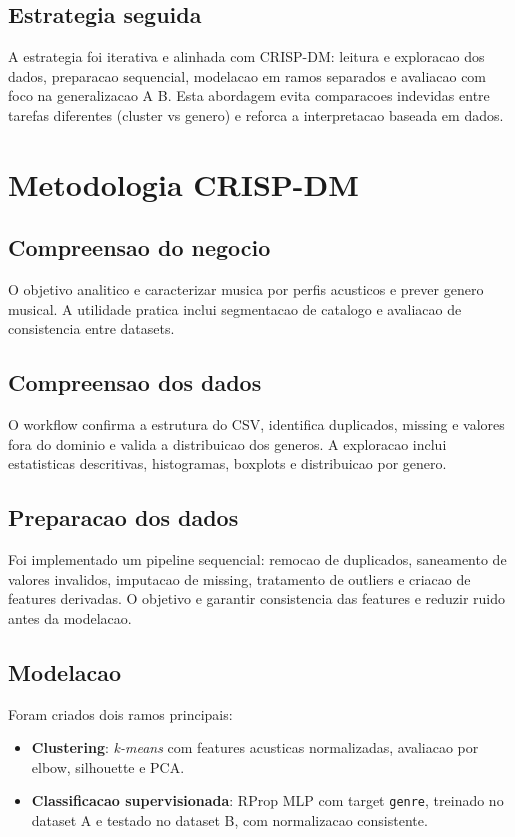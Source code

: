 \documentclass[11pt,a4paper]{article}
\begin{document}
\subsection{Estrategia seguida}
A estrategia foi iterativa e alinhada com CRISP-DM: leitura e exploracao dos dados, preparacao sequencial, modelacao em ramos separados e avaliacao com foco na generalizacao A \textrightarrow B. Esta abordagem evita comparacoes indevidas entre tarefas diferentes (cluster vs genero) e reforca a interpretacao baseada em dados.

\section{Metodologia CRISP-DM}
\subsection{Compreensao do negocio}
O objetivo analitico e caracterizar musica por perfis acusticos e prever genero musical. A utilidade pratica inclui segmentacao de catalogo e avaliacao de consistencia entre datasets.

\subsection{Compreensao dos dados}
O workflow confirma a estrutura do CSV, identifica duplicados, missing e valores fora do dominio e valida a distribuicao dos generos. A exploracao inclui estatisticas descritivas, histogramas, boxplots e distribuicao por genero.

\subsection{Preparacao dos dados}
Foi implementado um pipeline sequencial: remocao de duplicados, saneamento de valores invalidos, imputacao de missing, tratamento de outliers e criacao de features derivadas. O objetivo e garantir consistencia das features e reduzir ruido antes da modelacao.

\subsection{Modelacao}
Foram criados dois ramos principais:
\begin{itemize}[leftmargin=*]
    \item \textbf{Clustering}: \textit{k-means} com features acusticas normalizadas, avaliacao por elbow, silhouette e PCA.
    \item \textbf{Classificacao supervisionada}: RProp MLP com target \texttt{genre}, treinado no dataset A e testado no dataset B, com normalizacao consistente.
\end{itemize}
\end{document}

